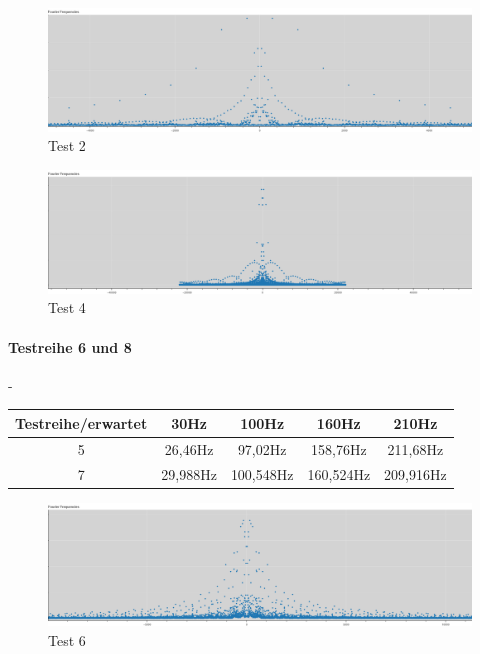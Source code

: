 \begin{figure}[h!]
	\centering      
	\includegraphics[scale=0.34]{results/test2.png}
	\caption{Test 2}
	\label{fig:test2}
\end{figure}

\begin{figure}[h!]
	\centering      
	\includegraphics[scale=0.34]{results/test4.png}
	\caption{Test 4}
	\label{fig:test4}
\end{figure}

\newpage

\paragraph{Testreihe 6 und 8}
-

\begin{table}[h!]
	\centering
	\begin{tabular}{|c | c | c | c | c |}		
		\hline
		Testreihe/erwartet & 30Hz & 100Hz & 160Hz & 210Hz\\
		\hline\hline
		5		&	26,46Hz & 97,02Hz & 158,76Hz & 211,68Hz \\
		7		&	29,988Hz & 100,548Hz & 160,524Hz & 209,916Hz \\
		\hline	
	\end{tabular}	
\end{table}


\begin{figure}[h!]
	\centering      
	\includegraphics[scale=0.34]{results/test6.png}
	\caption{Test 6}
	\label{fig:test6}
\end{figure}

